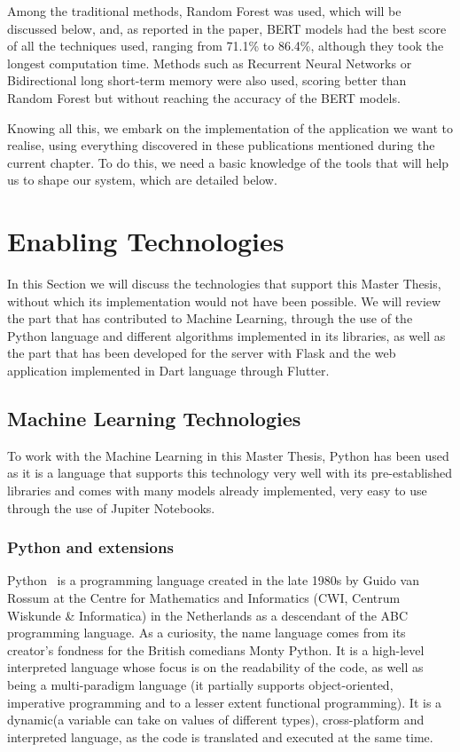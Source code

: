 Among the traditional methods, Random Forest was used, which will be discussed below, and, as reported in the paper, BERT models had the best score of all the techniques used, ranging from 71.1\% to 86.4\%, although they took the longest computation time. Methods such as Recurrent Neural Networks or Bidirectional long short-term memory were also used, scoring better than Random Forest but without reaching the accuracy of the BERT models.



Knowing all this, we embark on the implementation of the application we want to realise, using everything discovered in these publications mentioned during the current chapter. To do this, we need a basic knowledge of the tools that will help us to shape our system, which are detailed below. 


\section{Enabling Technologies}
In this Section we will discuss the technologies that support this Master Thesis, without which its implementation would not have been possible. We will review the part that has contributed to Machine Learning, through the use of the Python language and different algorithms implemented in its libraries, as well as the part that has been developed for the server with Flask and the web application implemented in Dart language through Flutter.

\subsection{Machine Learning Technologies}
To work with the Machine Learning in this Master Thesis, Python has been used as it is a language that supports this technology very well with its pre-established libraries and comes with many models already implemented, very easy to use through the use of Jupiter Notebooks.

\subsubsection{Python and extensions}
Python~\cite{Welcomet44:online} is a programming language created in the late 1980s by Guido van Rossum at the Centre for Mathematics and Informatics (CWI, Centrum Wiskunde \& Informatica) in the Netherlands as a descendant of the ABC programming language. As a curiosity, the name language comes from its creator's fondness for the British comedians Monty Python. It is a high-level interpreted language whose focus is on the readability of the code, as well as being a multi-paradigm language (it partially supports object-oriented, imperative programming and to a lesser extent functional programming). It is a dynamic(a variable can take on values of different types), cross-platform and interpreted language, as the code is translated and executed at the same time.

